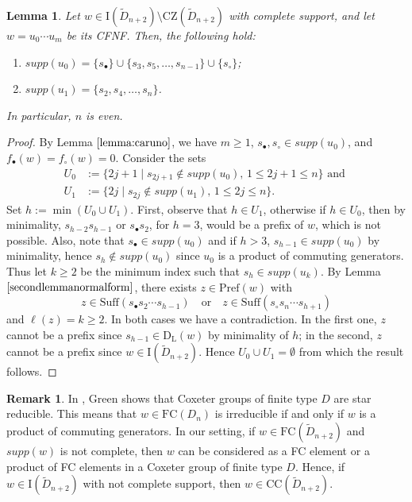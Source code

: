 \documentclass{amsart}
\newcommand{\D}{{\widetilde{D}_{n+2}}}
\newcommand{\ld}{{\mathrm{D}_{\mathrm{L}}}}
\newcommand{\fc}{{\mathrm{FC}}}
\newcommand{\s}{{s_{\bullet}}}
\newcommand{\sn}{{s_\circ}}
\newcommand{\su}{\mathrm{Suff}}
\newcommand{\pr}{\mathrm{Pref}}
\newcommand{\TTC}{\mathrm{CC}}
\newcommand{\zz}{\mathrm{CZ}}
\newcommand{\I}{\mathrm{I}}
\newtheorem{Lemma}[Theorem]{Lemma}
\theoremstyle{definition}
\newtheorem{Remark}[Theorem]{Remark}
\begin{document}
\begin{Lemma}
\label{cardue}
Let $w\in \I(\D)\setminus \zz(\D)$ with complete support, and let $w=u_0\cdots u_m$ be its CFNF. Then, the following hold:
\begin{enumerate}
    \item[(a)]  $supp(u_0)=\{\s\} \cup \{s_3, s_5,\ldots, s_{n-1}\} \cup \{\sn\}$;
    \item[(b)] $supp(u_1)= \{s_2, s_4, \ldots, s_n\}$.
\end{enumerate}
In particular, $n$ is even.
\end{Lemma}
\begin{proof}
By Lemma $\ref{lemma:caruno}$, we have $m\ge 1$, $\s,\sn\in supp(u_0)$, and $f_\bullet(w)=f_\circ(w)=0$. Consider the sets 
\begin{align*}
    U_0&:=\{2j+1 \mid s_{2j+1}\notin supp(u_0), \, 1 \leq 2j+1 \leq n\} \mbox{ and }\\
    U_1&:=\{ 2j \mid s_{2j}\notin supp(u_1), \, 1\le 2j\le n\}.
\end{align*}
Set $h:=\min( U_0\cup U_1)$.
First, observe that $h\in U_1$, otherwise if $h\in U_0$, then by minimality, $s_{h-2}s_{h-1}$ or $\s s_2$, for $h=3$, would be a prefix of $w$, which is not possible. Also, note that $\s \in supp(u_0)$ and if $h> 3$,  $s_{h-1}\in supp(u_0)$ by minimality, hence $s_h\notin supp(u_0)$ since $u_0$ is a product of commuting generators. Thus let $k\geq 2$ be the minimum index such that $s_{h}\in supp(u_k)$. By Lemma $\ref{secondlemmanormalform}$, there exists $z\in \pr(w)$ with
\[z\in \su(\s s_2\cdots s_{h-1}) \quad \mbox{or} \quad z\in \su(\sn s_n\cdots s_{h+1})\] and $\ell(z)=k\ge 2$. In both cases we have a contradiction. In the first one, $z$ cannot be a prefix since $s_{h-1}\in \ld(w)$ by minimality of $h$; in the second, $z$ cannot be a prefix since $w\in \I(\D)$. 
Hence $U_0\cup U_1=\emptyset$ from which the result follows.
\end{proof}

\begin{Remark}
\label{rem:stared}
    In \cite[Theorem 6.3]{GreenStar}, Green shows that Coxeter groups of finite type $D$ are star reducible. This means that $w\in \fc(D_n)$ is irreducible if and only if $w$ is a product of commuting generators. 
    In our setting, if $w\in \fc(\D)$ and $supp(w)$ is not complete, then $w$ can be considered as a FC element or a product of FC elements in a Coxeter group of finite type $D$. Hence, if $w\in \I(\D)$ with not complete support, then $w\in \TTC(\D)$.
\end{Remark}
\end{document}
